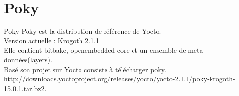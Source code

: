 \section{Poky}

\begin{frame}{Poky}{}
	Poky est la distribution de référence de Yocto.\\
	Version actuelle : Krogoth 2.1.1\\
	Elle contient bitbake, openembedded core et un ensemble de meta-données(layers).\\
	Basé son projet sur Yocto consiste à télécharger poky.\\
	\url{http://downloads.yoctoproject.org/releases/yocto/yocto-2.1.1/poky-krogoth-15.0.1.tar.bz2}.\\
\end{frame}





